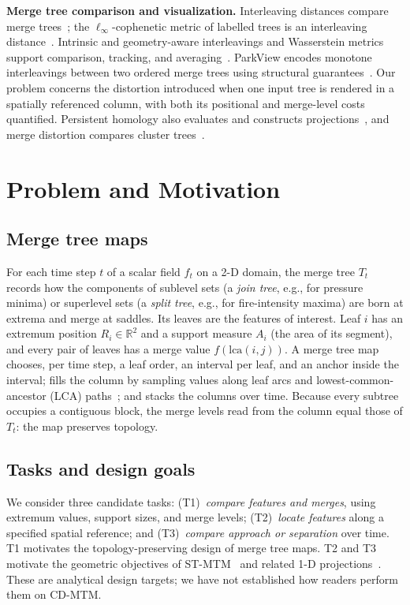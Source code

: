 \documentclass[review]{vgtc}                 %
\newcommand{\lca}{\mathrm{lca}}
\begin{document}
\textbf{Merge tree comparison and visualization.}
Interleaving distances compare merge trees~\cite{Morozov:2013:IDMT}; the $\ell_\infty$-cophenetic metric of labelled trees is an interleaving distance~\cite{Munch:2019:LINF}. Intrinsic and geometry-aware interleavings and Wasserstein metrics support comparison, tracking, and averaging~\cite{Gasparovic:2024:IID,Yan:2022:GAMT,Pont:2022:WMT}. ParkView encodes monotone interleavings between two ordered merge trees using structural guarantees~\cite{Beurskens:2025:ParkView}. Our problem concerns the distortion introduced when one input tree is rendered in a spatially referenced column, with both its positional and merge-level costs quantified. Persistent homology also evaluates and constructs projections~\cite{Rieck:2015:PH,Doraiswamy:2021:TM}, and merge distortion compares cluster trees~\cite{Eldridge:2015:MD}.

\section{Problem and Motivation}\label{sec:model}



\subsection{Merge tree maps}
For each time step $t$ of a scalar field $f_t$ on a 2-D domain, the merge tree $T_t$ records how the components of sublevel sets (a \emph{join tree}, e.g., for pressure minima) or superlevel sets (a \emph{split tree}, e.g., for fire-intensity maxima) are born at extrema and merge at saddles. Its leaves are the features of interest. Leaf $i$ has an extremum position $R_i\in\mathbb R^2$ and a support measure $A_i$ (the area of its segment), and every pair of leaves has a merge value $f(\lca(i,j))$. A merge tree map chooses, per time step, a leaf order, an interval per leaf, and an anchor inside the interval; fills the column by sampling values along leaf arcs and lowest-common-ancestor (LCA) paths~\cite{Koepp:2023:TMTM,STMTM:2026}; and stacks the columns over time. Because every subtree occupies a contiguous block, the merge levels read from the column equal those of $T_t$: the map preserves topology.

\subsection{Tasks and design goals}\label{sec:tasks}
We consider three candidate tasks: (T1)~\emph{compare features and merges}, using extremum values, support sizes, and merge levels; (T2)~\emph{locate features} along a specified spatial reference; and (T3)~\emph{compare approach or separation} over time. T1 motivates the topology-preserving design of merge tree maps. T2 and T3 motivate the geometric objectives of ST-MTM~\cite{STMTM:2026} and related 1-D projections~\cite{Franke:2021:1DP}. These are analytical design targets; we have not established how readers perform them on CD-MTM.
\end{document}
